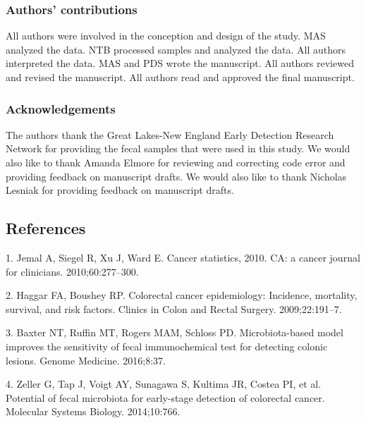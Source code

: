 \documentclass[12pt,]{article}
\begin{document}
\subsubsection{Authors' contributions}\label{authors-contributions}

All authors were involved in the conception and design of the study. MAS
analyzed the data. NTB processed samples and analyzed the data. All
authors interpreted the data. MAS and PDS wrote the manuscript. All
authors reviewed and revised the manuscript. All authors read and
approved the final manuscript.

\subsubsection{Acknowledgements}\label{acknowledgements}

The authors thank the Great Lakes-New England Early Detection Research
Network for providing the fecal samples that were used in this study. We
would also like to thank Amanda Elmore for reviewing and correcting code
error and providing feedback on manuscript drafts. We would also like to
thank Nicholas Lesniak for providing feedback on manuscript drafts.

\newpage

\subsection*{References}\label{references}

\hypertarget{refs}{}
\hypertarget{ref-jemal_cancer_2010}{}
1. Jemal A, Siegel R, Xu J, Ward E. Cancer statistics, 2010. CA: a
cancer journal for clinicians. 2010;60:277--300.

\hypertarget{ref-haggar_colorectal_2009}{}
2. Haggar FA, Boushey RP. Colorectal cancer epidemiology: Incidence,
mortality, survival, and risk factors. Clinics in Colon and Rectal
Surgery. 2009;22:191--7.

\hypertarget{ref-baxter_microbiota-based_2016}{}
3. Baxter NT, Ruffin MT, Rogers MAM, Schloss PD. Microbiota-based model
improves the sensitivity of fecal immunochemical test for detecting
colonic lesions. Genome Medicine. 2016;8:37.

\hypertarget{ref-zeller_potential_2014}{}
4. Zeller G, Tap J, Voigt AY, Sunagawa S, Kultima JR, Costea PI, et al.
Potential of fecal microbiota for early-stage detection of colorectal
cancer. Molecular Systems Biology. 2014;10:766.
\end{document}
